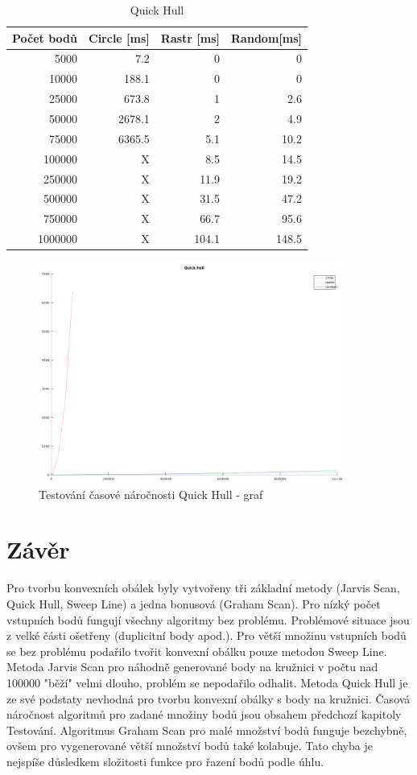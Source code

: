 \documentclass[a4paper, 12pt]{article}
\begin{document}
\begin{table}[h!]
	\centering
	\begin{tabular}{|r|r|r|r|}
	\hline
	 \textbf{Počet bodů} 	& \textbf{Circle [ms]} & \textbf{Rastr [ms]}  & \textbf{Random[ms]} \\ \hline
	 5000 & 7.2 & 0 & 0   \\ \hline
	10000 & 188.1 & 0 & 0   \\ \hline
	25000 & 673.8 & 1 & 2.6  \\ \hline
	50000 & 2678.1 & 2 & 4.9   \\ \hline
	75000 & 6365.5 & 5.1 & 10.2  \\ \hline
	100000 & X & 8.5 & 14.5  \\ \hline
	250000 & X & 11.9 & 19.2   \\ \hline
	500000 & X & 31.5 & 47.2  \\ \hline
	750000 & X & 66.7 & 95.6  \\ \hline
	1000000 & X & 104.1 & 148.5 \\ \hline
	
	\end{tabular}
		\caption{Quick Hull}
\end{table}

\begin{figure}[h!]
	\centering
	\includegraphics[width=10cm]{figure_quick_hull.png}
	\caption{Testování časové náročnosti Quick Hull - graf}
\end{figure}

\section{Závěr}
Pro tvorbu konvexních obálek byly vytvořeny tři základní metody (Jarvis Scan, Quick Hull, Sweep Line) a jedna bonusová (Graham Scan). Pro nízký počet vstupních bodů fungují všechny algoritmy bez problému. Problémové situace jsou z velké části ošetřeny (duplicitní body apod.). Pro větší množinu vstupních bodů se bez problému podařilo tvořit konvexní obálku pouze metodou Sweep Line. Metoda Jarvis Scan pro náhodně generované body na kružnici v počtu nad 100000 "běží" velmi dlouho, problém se nepodařilo odhalit. Metoda Quick Hull je ze své podstaty nevhodná pro tvorbu konvexní obálky s body na kružnici. Časová náročnost algoritmů pro zadané množiny bodů jsou obsahem předchozí kapitoly Testování. Algoritmus Graham Scan pro malé množství bodů funguje bezchybně, ovšem pro vygenerované větší množství bodů také kolabuje. Tato chyba je nejspíše důsledkem složitosti funkce pro řazení bodů podle úhlu.
\end{document}
